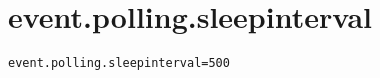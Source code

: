 \section{event.polling.sleepinterval}
\label{configuration:EventPollingSleepinterval}
\AvailableInJavaAndCsharp{\TODO}
\begin{lstlisting}[style=Props,caption={Usage example for \textit{event.polling.sleepinterval}}]
event.polling.sleepinterval=500
\end{lstlisting}